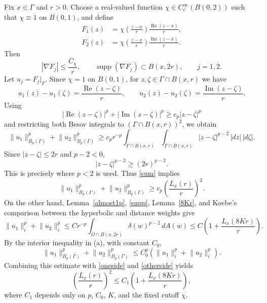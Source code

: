 \documentclass[11pt]{article}
\numberwithin{equation}{section}
\theoremstyle{remark}
\begin{document}
Fix $x\in\Gamma$ and $r>0$. Choose a real-valued function
$\chi\in C_c^\infty(B(0,2))$ such that $\chi\equiv 1$ on $B(0,1)$, and define
\begin{equation}
  \begin{aligned}
  F_1(z)&=\chi\left(\frac{z-x}{r}\right)
  \frac{\operatorname{Re}(z-x)}{r},\\
  F_2(z)&=\chi\left(\frac{z-x}{r}\right)
  \frac{\operatorname{Im}(z-x)}{r}.
  \end{aligned}
\end{equation}
Then
\begin{equation}\label{supp}
  |\nabla F_j|\le\frac{C_\chi}{r},
  \qquad
  \operatorname{supp}(\nabla F_j)\subset B(x,2r),
  \qquad j=1,2.
\end{equation}
Let $u_j=F_j|_\Gamma$.  Since $\chi=1$ on $B(0,1)$, for
$z,\zeta\in \Gamma\cap B(x,r)$ we have
\[
  u_1(z)-u_1(\zeta)=\frac{\operatorname{Re}(z-\zeta)}{r},
  \qquad
  u_2(z)-u_2(\zeta)=\frac{\operatorname{Im}(z-\zeta)}{r}.
\]
Using
\[
  |\operatorname{Re}(z-\zeta)|^p
  +|\operatorname{Im}(z-\zeta)|^p
  \ge c_p|z-\zeta|^p
\]
and restricting both Besov integrals to
$(\Gamma\cap B(x,r))^2$, we obtain
\begin{equation}\label{sum}
 \lVert u_1\rVert_{B_p(\Gamma)}^p +  \lVert u_2\rVert_{B_p(\Gamma)}^p
  \ge c_pr^{-p}\int_{\Gamma\cap B(x,r)}\int_{\Gamma\cap B(x,r)} |z-\zeta|^{p-2}
  \,|dz|\,|d\zeta|.
\end{equation}
Since $|z-\zeta|\le2r$ and $p-2<0$,
\[
|z-\zeta|^{p-2}\ge(2r)^{p-2}.
\]
This is precisely where $p<2$ is used.  Thus \eqref{sum} implies
\begin{equation}\label{oneside}
 \lVert u_1\rVert_{B_p(\Gamma)}^p +  \lVert u_2\rVert_{B_p(\Gamma)}^p 
  \ge c_p\left(\frac{L_x(r)}{r}\right)^2.
\end{equation}
On the other hand, Lemma~\ref{almost1p}, \eqref{supp},
Lemma~\ref{8Kr}, and Koebe's comparison between the hyperbolic and distance
weights give
\begin{equation}\label{otherside}
    \lVert u_1\rVert_i^p + \lVert u_2\rVert_i^p  
\le Cr^{-p}\int_{\Omega\cap B(x,2r)}  
\delta(w)^{p-2}\,dA(w)   
\le C\left(1+\frac{L_x(8K r)}{r}\right).
\end{equation} 
By the interior inequality in \rm(a), with constant $C_0$,
\[
 \lVert u_1\rVert_{B_p(\Gamma)}^p + \lVert u_2\rVert_{B_p(\Gamma)}^p
  \le C_0^p (\lVert u_1\rVert_i^p + \lVert u_2\rVert_i^p).
\]
Combining this estimate with \eqref{oneside} and \eqref{otherside}
yields
\begin{equation}\label{recu}
  \left(\frac{L_x(r)}{r}\right)^2
  \le C_1\left(1+\frac{L_x(8K r)}{r}\right),
\end{equation}
where $C_1$ depends only on $p$, $C_0$, $K$, and the fixed cutoff $\chi$.
\end{document}

